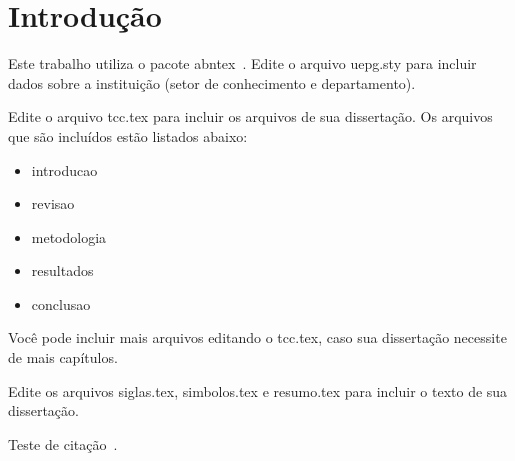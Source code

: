\chapter{Introdução}
Este trabalho utiliza o pacote abntex~\cite{abntex2classe}. 
Edite o arquivo uepg.sty para incluir dados sobre a instituição (setor de conhecimento e departamento).

Edite o arquivo tcc.tex para incluir os arquivos de sua dissertação. Os arquivos que são incluídos estão listados abaixo:

\begin{itemize}	
	\item introducao
	\item revisao
 	\item metodologia
	\item resultados
	\item conclusao
\end{itemize}

Você pode incluir mais arquivos editando o tcc.tex, caso sua dissertação necessite de mais capítulos.

Edite os arquivos siglas.tex, simbolos.tex e resumo.tex para incluir o texto de sua dissertação.

Teste de citação~\cite{teste}.

